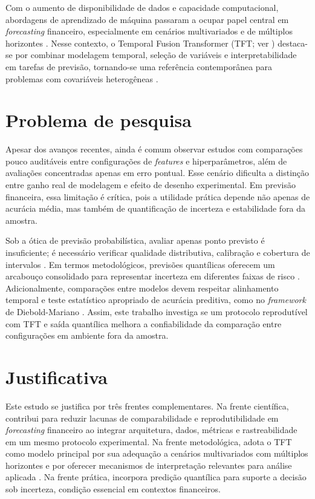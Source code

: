 Com o aumento de disponibilidade de dados e capacidade computacional, abordagens de aprendizado de máquina passaram a ocupar papel central em \textit{forecasting} financeiro, especialmente em cenários multivariados e de múltiplos horizontes \cite{LIMZOHREN2021}. Nesse contexto, o Temporal Fusion Transformer (TFT; ver ) destaca-se por combinar modelagem temporal, seleção de variáveis e interpretabilidade em tarefas de previsão, tornando-se uma referência contemporânea para problemas com covariáveis heterogêneas \cite{LIMETAL2021TFT}.

\section{Problema de pesquisa}
Apesar dos avanços recentes, ainda é comum observar estudos com comparações pouco auditáveis entre configurações de \textit{features} e hiperparâmetros, além de avaliações concentradas apenas em erro pontual. Esse cenário dificulta a distinção entre ganho real de modelagem e efeito de desenho experimental. Em previsão financeira, essa limitação é crítica, pois a utilidade prática depende não apenas de acurácia média, mas também de quantificação de incerteza e estabilidade fora da amostra.

Sob a ótica de previsão probabilística, avaliar apenas ponto previsto é insuficiente; é necessário verificar qualidade distributiva, calibração e cobertura de intervalos \cite{GNEITING2007}. Em termos metodológicos, previsões quantílicas oferecem um arcabouço consolidado para representar incerteza em diferentes faixas de risco \cite{KOENKERBASSETT1978}. Adicionalmente, comparações entre modelos devem respeitar alinhamento temporal e teste estatístico apropriado de acurácia preditiva, como no \textit{framework} de Diebold-Mariano \cite{DIEBOLDMARIANO1995}. Assim, este trabalho investiga se um protocolo reprodutível com TFT e saída quantílica melhora a confiabilidade da comparação entre configurações em ambiente fora da amostra.

\section{Justificativa}
Este estudo se justifica por três frentes complementares. Na frente científica, contribui para reduzir lacunas de comparabilidade e reprodutibilidade em \textit{forecasting} financeiro ao integrar arquitetura, dados, métricas e rastreabilidade em um mesmo protocolo experimental. Na frente metodológica, adota o TFT como modelo principal por sua adequação a cenários multivariados com múltiplos horizontes e por oferecer mecanismos de interpretação relevantes para análise aplicada \cite{LIMETAL2021TFT}. Na frente prática, incorpora predição quantílica para suporte a decisão sob incerteza, condição essencial em contextos financeiros.

